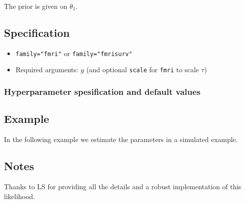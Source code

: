 \documentclass[a4paper,11pt]{article}
\begin{document}
The prior is given on $\theta_1$.

\subsection*{Specification}

\begin{itemize}
\item \texttt{family="fmri"} or \texttt{family="fmrisurv"}
\item Required arguments: $y$ (and optional \texttt{scale} for
    \texttt{fmri} to scale $\tau$)
\end{itemize}

\subsubsection*{Hyperparameter spesification and default values}



\subsection*{Example}

In the following example we estimate the parameters in a simulated
example.


\subsection*{Notes}

Thanks to LS for providing all the details and a robust implementation
of this likelihood.
\end{document}
